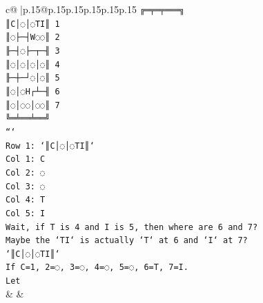 \documentclass{article}
\begin{document}
{\begin{supertabular}{c@{$\;$}|p{.15\linewidth}@{}p{.15\linewidth}p{.15\linewidth}p{.15\linewidth}p{.15\linewidth}p{.15\linewidth}}
{{{\texttt{╔═╤═╤═══╗} \\
\texttt{║C│◌│◌TI║ 1} \\
\texttt{║◌├─┤W◌◌║ 2} \\
\texttt{╟─┤◌├─┬─╢ 3} \\
\texttt{║◌│◌│◌│◌║ 4} \\
\texttt{╟─┼─┘◌│◌║ 5} \\
\texttt{║◌│◌H┌┴─╢ 6} \\
\texttt{║◌│◌◌│◌◌║ 7} \\
\texttt{╚═╧══╧══╝} \\
\texttt{```} \\
\texttt{Row 1: `║C│◌│◌TI║`} \\
\texttt{Col 1: C} \\
\texttt{Col 2: ◌} \\
\texttt{Col 3: ◌} \\
\texttt{Col 4: T} \\
\texttt{Col 5: I} \\
\texttt{Wait, if T is 4 and I is 5, then where are 6 and 7?} \\
\texttt{Maybe the `TI` is actually `T` at 6 and `I` at 7?} \\
\texttt{`║C│◌│◌TI║`} \\
\texttt{If C=1, 2=◌, 3=◌, 4=◌, 5=◌, 6=T, 7=I.} \\
\texttt{Let} \\
            }
        }
    }
    & & \\ \\


\end{supertabular}}
\end{document}
